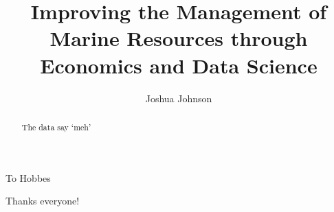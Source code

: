 \documentclass[twoside,12pt,final]{ucthesis-CA2012}
\begin{document}
\begin{ucfrontmatter}


  \title{Improving the Management of Marine Resources through Economics and Data Science}

  \author{Joshua Johnson}

     


	\maketitle
	\approvalpage
	\copyrightpage

    \begin{dedication}

      \vspace*{25ex}
      \begin{center}
      \begin{Large}

        To Hobbes

      \end{Large}
      \end{center}
  \end{dedication}
  \begin{acknowledgements}
    Thanks everyone!
  \end{acknowledgements}
  \begin{abstract}

    The data say `meh'

  \end{abstract}
	\tableofcontents

	  \listoftables
  
    \listoffigures
  
\end{ucfrontmatter}
\end{document}
